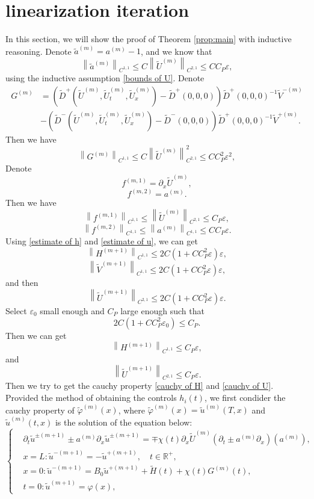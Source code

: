 \documentclass[a4paper,reqno,11pt]{amsart}
\numberwithin{equation}{section} %
\begin{document}
\section{linearization iteration}
In this section, we will show the proof of Theorem \ref{prop:main} with inductive reasoning. Denote $\tilde{a}^{(m)}=a^{(m)}-1$, and we know that
$$
\left\| \tilde{a}^{(m)} \right\| _{C^{1,1}}\leq C\left\| \tilde{U}^{(m)} \right\| _{C^{2,1}}\leq CC_P\varepsilon ,
$$
using the inductive assumption \eqref{bounds of U}.
Denote
$$
\begin{aligned}
	G^{(m)} &=\left(\widetilde{D}^{+}\left(\widetilde{U}^{(m)}, \widetilde{U}_t^{(m)}, \widetilde{U}_x^{(m)}\right)-\widetilde{D}^{+}(0,0,0)\right) \widetilde{D}^{+}(0,0,0)^{-1} \widetilde{V}^{-(m)} \\
		& -\left(\widetilde{D}^{-}\left(\widetilde{U}^{(m)}, \widetilde{U}_t^{(m)}, \widetilde{U}_x^{(m)}\right)-\widetilde{D}^{-}(0,0,0)\right) \widetilde{D}^{+}(0,0,0)^{-1} \widetilde{V}^{+(m)}.
\end{aligned}
$$
Then we have
$$
\left\| G^{(m)} \right\| _{C^{1,1}}\leq C\left\| \tilde{U}^{(m)} \right\| _{C^{2,1}}^{2}\leq CC_{P}^{2}\varepsilon ^2,
$$
Denote
$$
f^{(m,1)}=\partial _x\tilde{U}^{(m)},
$$
$$
f^{\left( m,2 \right)}=a^{\left( m \right)}.
$$
Then we have
$$
\left\| f^{(m,1)} \right\| _{C^{1,1}}\le \left\| \tilde{U}^{(m)} \right\| _{C^{2,1}}\leq C_P\varepsilon ,
$$
$$
\left\| f^{(m,2)} \right\| _{C^{1,1}}\le \left\| a^{\left( m \right)} \right\| _{C^{1,1}}\leq CC_P\varepsilon .
$$
Using \eqref{estimate of h} and \eqref{estimate of u}, we can get
$$
\left\| H^{(m+1)} \right\| _{C^{1,1}}\leq 2C\left( 1+CC_{P}^{2}\varepsilon \right) \varepsilon, 
$$
$$
\left\| \tilde{V}^{(m+1)} \right\| _{C^{1,1}} \leq 2C\left( 1+CC_{P}^{2}\varepsilon \right) \varepsilon ,
$$
and then
$$
\left\| \tilde{U}^{(m+1)} \right\| _{C^{2,1}} \leq 2C\left( 1+CC_{P}^{2}\varepsilon \right) \varepsilon .
$$
Select $\varepsilon _0$ small enough and $C_P$ large enough such that
$$
2C\left( 1+CC_{P}^{2}\varepsilon _0 \right) \leq C_P.
$$
Then we can get
$$
\left\| H^{(m+1)} \right\| _{C^{1,1}}\leq C_P\varepsilon,
$$
and
$$
\left\| \tilde{U}^{(m+1)} \right\| _{C^{2,1}}\leq C_P\varepsilon.
$$
Then we try to get the cauchy property \eqref{cauchy of H} and \eqref{cauchy of U}. Provided the method of obtaining the controls $h_i(t)$, we first condider the cauchy property of $\tilde{\varphi }^{(m)}(x)$, where $\tilde{\varphi }^{(m)}(x)=\tilde{u}^{(m)}(T,x)$ and $\tilde{u}^{(m)}(t,x)$ is the solution of the equation below:
$$
\begin{cases}
	&		\partial _t\widetilde{u}^{\pm (m+1)}\pm a^{(m)}\partial _x\widetilde{u}^{\pm (m+1)}=\mp \chi \left( t \right) \partial _x\widetilde{U}^{(m)}\left( \partial _t\pm a^{(m)}\partial _x \right) \left( a^{(m)} \right) ,\\
	&		x=L:\widetilde{u}^{-(m+1)}=-\widetilde{u}^{+(m+1)},\quad t\in \mathbb{R} ^+,\\
	&		x=0:\widetilde{u}^{-(m+1)}=B_0\widetilde{u}^{+(m+1)}+\widetilde{H}(t)+\chi \left( t \right)G^{\left( m \right)}\left( t \right) ,\\
	&		t=0:\widetilde{u}^{(m+1)}=\varphi \left( x \right) ,
\end{cases}
$$
\end{document}
